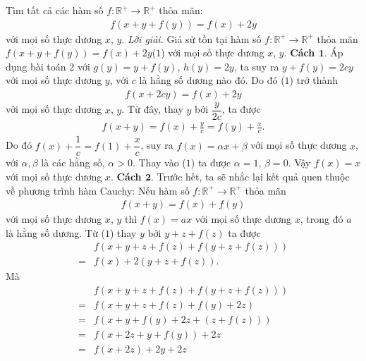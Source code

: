 \begin{multicols}{2}
		Tìm tất cả các hàm số $f:\mathbb{R^+}  \to \mathbb{R^+} $ thỏa mãn:
		\begin{align*}
			f(x+y+f(y))=f(x)+2 y
		\end{align*}
		với mọi số thực dương $x$, $y$.
		\vskip 0.1cm
		\textit{Lời giải.} Giả sử tồn tại hàm số $f:\mathbb{R^+}  \to \mathbb{R^+} $ thỏa mãn 
			$f(x+y+f(y))=f(x)+2 y $\hfill ($1$)
			\vskip 0.1cm
			với mọi số thực dương $x$, $y$.
			\vskip 0.1cm
			\textbf{\color{hoccungpi}Cách $\pmb{1.}$} 
			Áp dụng bài toán $2$ với $g(y)=y+f(y)$, $h(y)=2y$, ta suy ra
			$y + f(y) = 2cy$ với mọi số thực dương $y$, 
			với $c$ là hằng số dương nào đó. Do đó ($1$) trở thành
			\begin{align*}
				f(x + 2cy) = f(x) + 2y
			\end{align*}
			với mọi số thực dương $x$, $y$.
			Từ đây, thay $y$ bởi $\dfrac{y}{{2c}}$, ta được
			\begin{align*}
				f(x + y) = f(x) + \frac{y}{c}= f(y) + \frac{x}{c}.
			\end{align*}
			Do đó $ f(x) + \dfrac{1}{c} = f(1) + \dfrac{x}{c}$, suy ra
			$f(x) = \alpha x + \beta$ với mọi số thực dương $x$, với $\alpha ,\beta $ là các hằng số, $\alpha >0$. Thay vào ($1$) ta được
			$\alpha  = 1$, $\beta  = 0$. Vậy 
			$f(x)= x$ 	với mọi số thực dương $x$.
			\vskip 0.1cm
			\textbf{\color{hoccungpi}Cách $\pmb{2.}$} 
			Trước hết,  ta sẽ nhắc lại kết quả quen thuộc về phương trình hàm Cauchy: Nếu hàm số 	$f:\mathbb{R^+}  \to \mathbb{R^+} $ thỏa mãn 
			\begin{align*}
				f(x+y)=f(x)+f(y)
			\end{align*}
			với mọi số thực dương $x$, $y$ thì $f(x)=ax$ với mọi số thực dương $x$, trong đó $a$ là hằng số dương.
			Từ ($1$) thay $y$ bởi $y+z+f(z)$ ta được
			\begin{align*}
				&f\left( {x + y + z + f(z) + f\left( {y + z + f(z)} \right)} \right)\\
				= &f(x) + 2\left( {y + z + f(z)} \right).
			\end{align*}
			Mà
			\begin{align*}
				&f\left(x + y + z + f(z) + f\left(y+ z + f(z)\right)\right)\\
				= &f\left( {x + y + z + f(z) + f(y) + 2z} \right) \\
				=&  f\left( {x + y + f(y) + 2z + \left( {z + f(z)} \right)} \right) \\
				=&f\left( {x + 2z + y + f(y)} \right) + 2z\\
				=& f\left( {x + 2z} \right) + 2y + 2z 

\end{align*}
\end{multicols}

